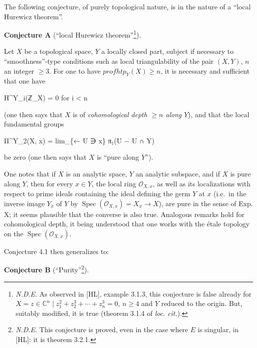 \documentclass[
  11pt,
  a4paper,
]{book}
\newenvironment{Shaded}{}{}
\newcommand{\NormalTok}[1]{#1}
\begin{document}
The following conjecture, of purely topological nature, is in the nature
of a ``local Hurewicz theorem''.

\textbf{Conjecture A} (``local Hurewicz theorem''\footnote{\emph{N.D.E.}
  As observed in {[}HL{]}, example 3.1.3, this conjecture is false
  already for \(X = {z \in
  \mathbb{C}^{n} \mid z^{2}_{1} + z^{3}_{2} + \cdots + z^{3}_{n} = 0}\),
  \(n \geqslant 4\) and \(Y\) reduced to the origin. But, suitably
  modified, it is true (theorem 3.1.4 of \emph{loc. cit.}).}).

Let \(X\) be a topological space, \(Y\) a locally closed part, subject
if necessary to ``smoothness''-type conditions such as local
triangulability of the pair \((X, Y)\), \(n\) an integer
\(\geqslant 3\). For one to have \(prof htp_{Y}(X) \geqslant n\), it is
necessary and sufficient that one have

\begin{Shaded}
\begin{Highlighting}[]
\NormalTok{H\^{}Y\_i(ℤ\_X) = 0   for i \textless{} n}
\end{Highlighting}
\end{Shaded}

(one then says that \(X\) is of \emph{cohomological depth
\(\geqslant n\) along \(Y\)}), and that the local fundamental groups

\begin{Shaded}
\begin{Highlighting}[]
\NormalTok{Π\^{}Y\_2(X, x) = lim\_\{← U ∋ x\} π₁(U − U ∩ Y)}
\end{Highlighting}
\end{Shaded}

be zero (one then says that \(X\) is ``pure along \(Y\)'').

One notes that if \(X\) is an analytic space, \(Y\) an analytic
subspace, and if \(X\) is pure along \(Y\), then for every \(x
\in Y\), the local ring \(\mathcal{O}_{X,x}\), as well as its
localizations with respect to prime ideals containing the ideal defining
the germ \(Y\) at \(x\) (i.e.~in the inverse image \(Y_{x}\) of \(Y\) by
\(\operatorname{Spec}(\mathcal{O}_{X,x})
= X_{x} \to X\)), are pure in the sense of Exp. X; it seems plausible
that the converse is also true. Analogous remarks hold for cohomological
depth, it being understood that one works with the étale topology on the
\(\operatorname{Spec}(\mathcal{O}_{X,x})\).

Conjecture 4.1 then generalizes to:

\textbf{Conjecture B} (``Purity''\footnote{\emph{N.D.E.} This conjecture
  is proved, even in the case where \(E\) is singular, in {[}HL{]}: it
  is theorem 3.2.1.}).
\end{document}
